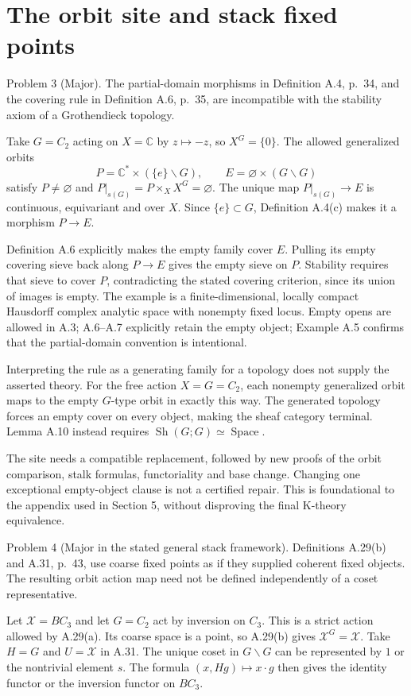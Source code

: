 \documentclass[10pt]{article}
\begin{document}
\section*{The orbit site and stack fixed points}
Problem 3 (Major).  The partial-domain morphisms in Definition A.4, p. 34, and the covering rule in Definition A.6, p. 35, are incompatible with the stability axiom of a Grothendieck topology.\par
Take \(G=C_2\) acting on \(X=\mathbb C\) by \(z\mapsto-z\), so \(X^G=\{0\}\). The allowed generalized orbits \[P=\mathbb C^*\times(\{e\}\backslash G),\qquad
 E=\varnothing\times(G\backslash G)\] satisfy \(P\ne\varnothing\) and \(P|_{s(G)}=P\times_X X^G=\varnothing\). The unique map \(P|_{s(G)}\to E\) is continuous, equivariant and over \(X\). Since \(\{e\}\subset G\), Definition A.4(c) makes it a morphism \(P\to E\).\par
Definition A.6 explicitly makes the empty family cover \(E\). Pulling its empty covering sieve back along \(P\to E\) gives the empty sieve on \(P\). Stability requires that sieve to cover \(P\), contradicting the stated covering criterion, since its union of images is empty. The example is a finite-dimensional, locally compact Hausdorff complex analytic space with nonempty fixed locus. Empty opens are allowed in A.3; A.6–A.7 explicitly retain the empty object; Example A.5 confirms that the partial-domain convention is intentional.\par
Interpreting the rule as a generating family for a topology does not supply the asserted theory. For the free action \(X=G=C_2\), each nonempty generalized orbit maps to the empty \(G\)-type orbit in exactly this way. The generated topology forces an empty cover on every object, making the sheaf category terminal. Lemma A.10 instead requires \(\operatorname{Sh}(G;G)\simeq\operatorname{Space}\).\par
The site needs a compatible replacement, followed by new proofs of the orbit comparison, stalk formulas, functoriality and base change. Changing one exceptional empty-object clause is not a certified repair. This is foundational to the appendix used in Section 5, without disproving the final K-theory equivalence.\par
Problem 4 (Major in the stated general stack framework).  Definitions A.29(b) and A.31, p. 43, use coarse fixed points as if they supplied coherent fixed objects. The resulting orbit action map need not be defined independently of a coset representative.\par
Let \(\mathcal X=BC_3\) and let \(G=C_2\) act by inversion on \(C_3\). This is a strict action allowed by A.29(a). Its coarse space is a point, so A.29(b) gives \(\mathcal X^G=\mathcal X\). Take \(H=G\) and \(U=\mathcal X\) in A.31. The unique coset in \(G\backslash G\) can be represented by \(1\) or the nontrivial element \(s\). The formula \((x,Hg)\mapsto x\cdot g\) then gives the identity functor or the inversion functor on \(BC_3\).\par
\end{document}
